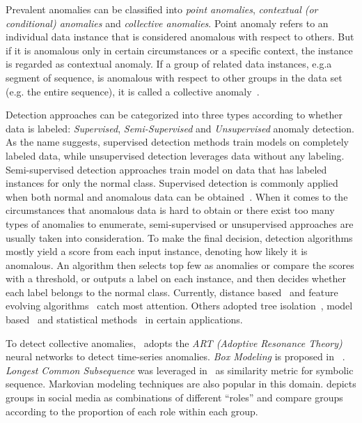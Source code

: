 \documentclass[10pt,conference,letterpaper]{IEEEtran}
\begin{document}
			Prevalent anomalies can be classified into \textit{point anomalies}, \textit{contextual (or conditional) anomalies} and \textit{collective anomalies}. Point anomaly refers to an individual data instance that is considered anomalous with respect to others. But if it is anomalous only in certain circumstances or a specific context, the instance is regarded as contextual anomaly. If a group of related data instances, e.g.a segment of sequence, is anomalous with respect to other groups in the data set (e.g. the entire sequence), it is called a collective anomaly~\cite{goldberger2000components}.
			
			Detection approaches can be categorized into three types according to whether data is labeled: \textit{Supervised}, \textit{Semi-Supervised} and \textit{Unsupervised} anomaly detection. As the name suggests, supervised detection methods train models on completely labeled data, while unsupervised detection leverages data without any labeling. Semi-supervised detection approaches train model on data that has labeled instances for only the normal class. Supervised detection is commonly applied when both normal and anomalous data can be obtained~\cite{fujimaki2005approach}. When it comes to the circumstances that anomalous data is hard to obtain or there exist too many types of anomalies to enumerate, semi-supervised or unsupervised approaches are usually taken into consideration.
			To make the final decision, detection algorithms mostly yield a score from each input instance, denoting how likely it is anomalous. An algorithm then selects top few as anomalies or compare the scores with a threshold, or outputs a label on each instance, and then decides whether each label belongs to the normal class.
			Currently, distance based~\cite{cao2014scalable,cao2017multi} and feature evolving algorithms~\cite{masud2013classification,li2015discovery,shao2014prototype} catch most attention. Others adopted tree isolation~\cite{zhang2017lshiforest}, model based~\cite{yin2016model} and statistical methods~\cite{zhu2002statstream} in certain applications.
	
			To detect collective anomalies,~\cite{caudell1993adaptive} adopts the \textit{ART (Adoptive Resonance Theory)} neural networks to detect time-series anomalies. \textit{Box Modeling} is proposed in ~\cite{chan2005modeling}. \textit{Longest Common Subsequence} was leveraged in~\cite{budalakoti2006anomaly} as similarity metric for symbolic sequence. Markovian modeling techniques are also popular in this domain\cite{ye2000markov,warrender1999detecting,pavlov2003sequence}. \cite{yu2015glad} depicts groups in social media as combinations of different ``roles'' and compare groups according to the proportion of each role within each group.
	
\end{document}
